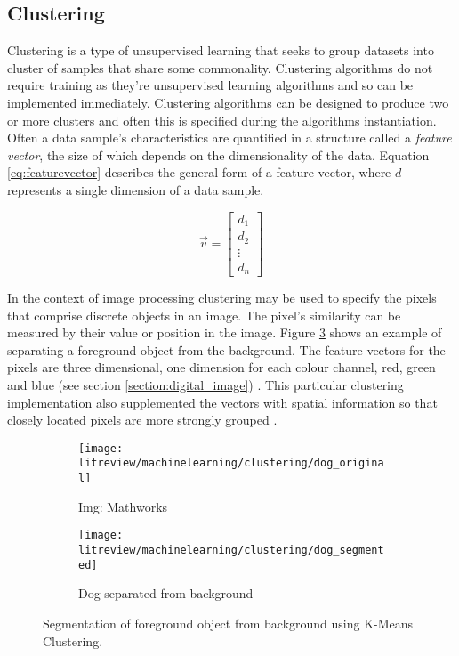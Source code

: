 \subsection{Clustering}
\label{subsection:clustering}
Clustering is a type of unsupervised learning that seeks to group datasets into cluster of samples that share some commonality. Clustering algorithms do not require training as they're unsupervised learning algorithms and so can be implemented immediately. Clustering algorithms can be designed to produce two or more clusters and often this is specified during the algorithms instantiation. Often a data sample's characteristics are quantified in a structure called a \emph{feature vector}, the size of which depends on the dimensionality of the data. Equation \ref{eq:featurevector} describes the general form of a feature vector, where $d$ represents a single dimension of a data sample. 

\begin{equation}
    \vec{v} = 
    \begin{bmatrix}
        d_1 \\
        d_2 \\
        \vdots \\ 
        d_n
    \end{bmatrix}
    \label{eq:featurevector}
\end{equation}

In the context of image processing clustering may be used to specify the pixels that comprise discrete objects in an image. The pixel's similarity can be measured by their value or position in the image. Figure \ref{fig:simple_cluster} shows an example of separating a foreground object from the background. The feature vectors for the pixels are three dimensional, one dimension for each colour channel, red, green and blue (see section \ref{section:digital_image}) \cite{patterns_machine_learning}. This particular clustering implementation also supplemented the vectors with spatial information so that closely located pixels are more strongly grouped \cite{matlab_kmeans_segment}.

\begin{figure}[htbp]
    \centering
     \begin{subfigure}[b]{0.45\textwidth}
        \texttt{[image: litreview/machinelearning/clustering/dog\_original]}
	\captionsetup{format = hang}
        \caption{Img: Mathworks}
        \label{fig:}
    \end{subfigure} 
    \begin{subfigure}[b]{0.45\textwidth}
        \texttt{[image: litreview/machinelearning/clustering/dog\_segmented]}	
	\captionsetup{format = hang}
        \caption{Dog separated from background \cite{matlab_kmeans_segment}}
        \label{fig:}
    \end{subfigure}
    \captionsetup{format = hang}
    \caption{Segmentation of foreground object from background using K-Means Clustering.}
    \label{fig:simple_cluster}
\end{figure}

    


